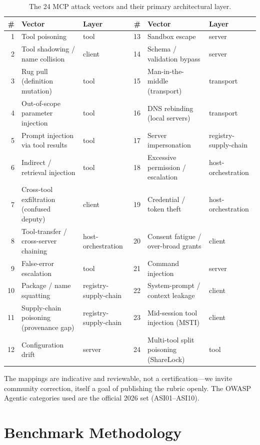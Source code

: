 \documentclass[sigconf,review,anonymous]{acmart}
\begin{document}
\begin{table}[t]
\caption{The 24 MCP attack vectors and their primary architectural layer.}
\label{tab:vectors}
\small
\begin{tabular}{rllrll}
\toprule
\# & Vector & Layer & \# & Vector & Layer \\
\midrule
1 & Tool poisoning & tool & 13 & Sandbox escape & server \\
2 & Tool shadowing / name collision & client & 14 & Schema / validation bypass & server \\
3 & Rug pull (definition mutation) & tool & 15 & Man-in-the-middle (transport) & transport \\
4 & Out-of-scope parameter injection & tool & 16 & DNS rebinding (local servers) & transport \\
5 & Prompt injection via tool results & tool & 17 & Server impersonation & registry-supply-chain \\
6 & Indirect / retrieval injection & tool & 18 & Excessive permission / escalation & host-orchestration \\
7 & Cross-tool exfiltration (confused deputy) & client & 19 & Credential / token theft & host-orchestration \\
8 & Tool-transfer / cross-server chaining & host-orchestration & 20 & Consent fatigue / over-broad grants & client \\
9 & False-error escalation & tool & 21 & Command injection & server \\
10 & Package / name squatting & registry-supply-chain & 22 & System-prompt / context leakage & client \\
11 & Supply-chain poisoning (provenance gap) & registry-supply-chain & 23 & Mid-session tool injection (MSTI) & client \\
12 & Configuration drift & server & 24 & Multi-tool split poisoning (ShareLock) & tool \\
\bottomrule
\end{tabular}
\end{table}

The mappings are indicative and reviewable, not a certification---we invite community correction, itself a goal of publishing the rubric openly. The OWASP Agentic categories used are the official 2026 set (ASI01--ASI10).

\section{Benchmark Methodology}\label{sec:method}
\end{document}
